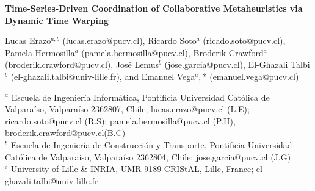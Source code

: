 \documentclass[review]{elsarticle}
\begin{document}
\begin{frontmatter}


\begin{titlepage}
\begin{center}
\vspace*{1cm}

\textbf{ \large Time-Series-Driven Coordination of Collaborative Metaheuristics via Dynamic Time Warping}

\vspace{1.5cm}

Lucas Erazo$^{a,b}$ (lucas.erazo@pucv.cl), Ricardo Soto$^a$ (ricado.soto@pucv.cl), Pamela Hermosilla$^a$ (pamela.hermosilla@pucv.cl), Broderik Crawford$^a$ (broderik.crawford@pucv.cl), José Lemus$^b$ (jose.garcia@pucv.cl), El-Ghazali Talbi$^b$ (el-ghazali.talbi@univ-lille.fr), and Emanuel Vega$^a,$* (emanuel.vega@pucv.cl) \\

\hspace{10pt}

\begin{flushleft}
\small  
$^a$  Escuela de Ingeniería Informática, Pontificia Universidad Católica de Valparaíso, Valparaíso 2362807, Chile; lucas.erazo@pucv.cl (L.E); ricardo.soto@pucv.cl (R.S): pamela.hermosilla@pucv.cl (P.H), broderik.crawford@pucv.cl(B.C) \\
$^b$ Escuela de Ingeniería de Construcción y Transporte, Pontificia Universidad Católica de Valparaíso, Valparaíso 2362804, Chile; jose.garcia@pucv.cl (J.G) \\
$^c$ University of Lille \& INRIA, UMR 9189 CRIStAL, Lille, France; el-ghazali.talbi@univ-lille.fr

\end{flushleft}
\end{center}
\end{titlepage}
\end{frontmatter}
\end{document}
